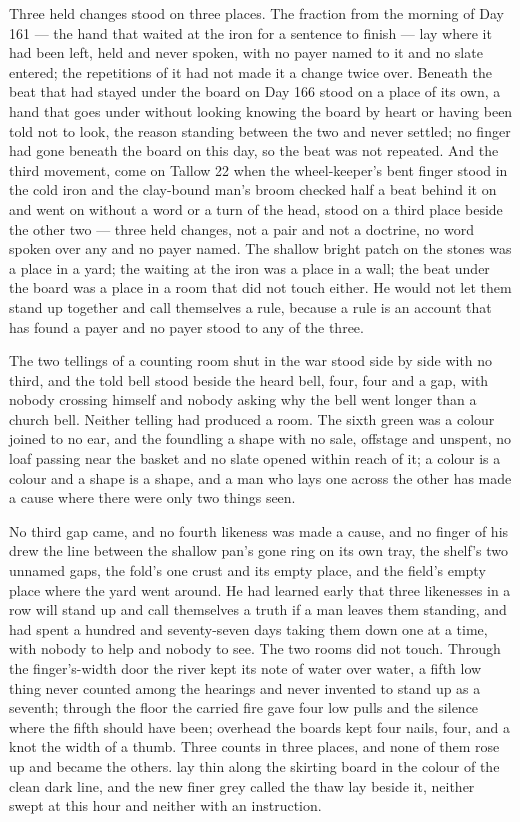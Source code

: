 Three held changes stood on three places. The fraction from the morning of Day 161 --- the hand that waited at the iron for a sentence to finish --- lay where it had been left, held and never spoken, with no payer named to it and no slate entered; the repetitions of it had not made it a change twice over. Beneath  the beat that had stayed under the board on Day 166 stood on a place of its own, a hand that goes under without looking knowing the board by heart or having been told not to look, the reason standing between the two and never settled; no finger had gone beneath the board on this day, so the beat was not repeated. And the third movement, come on Tallow 22 when the wheel-keeper's bent finger stood in the cold iron and the clay-bound man's broom checked half a beat behind it on  and went on without a word or a turn of the head, stood on a third place beside the other two --- three held changes, not a pair and not a doctrine, no word spoken over any and no payer named. The shallow bright patch on the stones was a place in a yard; the waiting at the iron was a place in a wall; the beat under the board was a place in a room that did not touch either. He would not let them stand up together and call themselves a rule, because a rule is an account that has found a payer and no payer stood to any of the three.

The two tellings of a counting room shut in the war stood side by side with no third, and the told bell stood beside the heard bell, four, four and a gap, with nobody crossing himself and nobody asking why the bell went longer than a church bell. Neither telling had produced a room. The sixth green was a colour joined to no ear, and the foundling a shape with no sale, offstage and unspent, no loaf passing near the basket and no slate opened within reach of it; a colour is a colour and a shape is a shape, and a man who lays one across the other has made a cause where there were only two things seen.

No third gap came, and no fourth likeness was made a cause, and no finger of his drew the line between the shallow pan's gone ring on its own tray, the shelf's two unnamed gaps, the fold's one crust and its empty place, and the field's empty place where the yard went around. He had learned early that three likenesses in a row will stand up and call themselves a truth if a man leaves them standing, and had spent a hundred and seventy-seven days taking them down one at a time, with nobody to help and nobody to see. The two rooms did not touch. Through the finger's-width door the river kept its note of water over water, a fifth low thing never counted among the hearings and never invented to stand up as a seventh; through the floor the carried fire gave four low pulls and the silence where the fifth should have been; overhead the boards kept four nails, four, and a knot the width of a thumb. Three counts in three places, and none of them rose up and became the others.  lay thin along the skirting board in the colour of the clean dark line, and the new finer grey called the thaw lay beside it, neither swept at this hour and neither with an instruction.

